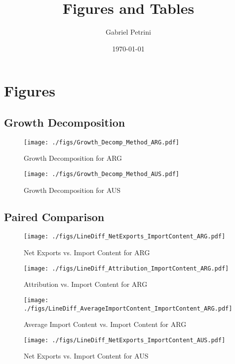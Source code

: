 \documentclass[11pt]{article}
\author{Gabriel Petrini}
\date{\today}
\title{Figures and Tables}
\begin{document}
\maketitle
\tableofcontents

\section{Figures}
\label{sec:org03364bf}

\subsection{Growth Decomposition}
\label{sec:orgc5aae59}

\begin{figure}[t]
\centering
\texttt{[image: ./figs/Growth\_Decomp\_Method\_ARG.pdf]}
\caption{Growth Decomposition for ARG}
\end{figure}

\begin{figure}[t]
\centering
\texttt{[image: ./figs/Growth\_Decomp\_Method\_AUS.pdf]}
\caption{Growth Decomposition for AUS}
\end{figure}
\subsection{Paired Comparison}
\label{sec:orgac4e63d}


\begin{figure}[H]
\centering
\texttt{[image: ./figs/LineDiff\_NetExports\_ImportContent\_ARG.pdf]}
\caption{Net Exports vs. Import Content for ARG}
\end{figure}

\begin{figure}[H]
\centering
\texttt{[image: ./figs/LineDiff\_Attribution\_ImportContent\_ARG.pdf]}
\caption{Attribution vs. Import Content for ARG}
\end{figure}

\begin{figure}[H]
\centering
\texttt{[image: ./figs/LineDiff\_AverageImportContent\_ImportContent\_ARG.pdf]}
\caption{Average Import Content vs. Import Content for ARG}
\end{figure}

\begin{figure}[H]
\centering
\texttt{[image: ./figs/LineDiff\_NetExports\_ImportContent\_AUS.pdf]}
\caption{Net Exports vs. Import Content for AUS}
\end{figure}
\end{document}
